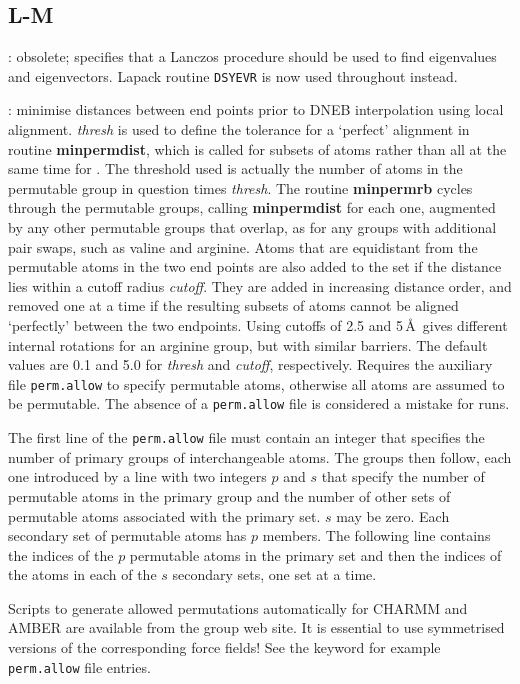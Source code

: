 {{\subsection{L-M}
: obsolete; specifies that a Lanczos procedure should be used to
find eigenvalues and eigenvectors. 
Lapack routine {\tt DSYEVR} is now used throughout instead.


: minimise distances between end points
prior to DNEB interpolation using local alignment.
{\it thresh} is used to define the tolerance for a `perfect' alignment
in routine {\bf minpermdist}, which is called for subsets of atoms
rather than all at the same time for {}.
The threshold used is actually the number of atoms in the permutable
group in question times {\it thresh\/}.
The routine {\bf minpermrb} cycles through the permutable groups,
calling {\bf minpermdist} for each one, augmented by any other permutable
groups that overlap, as for any groups with additional pair swaps, such
as valine and arginine.
Atoms that are equidistant from the permutable atoms in the two end points
are also added to the set if the distance lies within a cutoff
radius {\it cutoff\/}.
They are added in increasing distance order, and removed one at a time 
if the resulting subsets of atoms cannot be aligned `perfectly' between
the two endpoints.
Using cutoffs of 2.5 and 5\,\AA\ gives different internal rotations for
an arginine group, but with similar barriers. 
The default values are 0.1 and 5.0 for {\it thresh} and {\it cutoff\/},
respectively.
Requires the auxiliary file {\tt perm.allow} to specify permutable atoms, otherwise
all atoms are assumed to be permutable. The absence of a {\tt perm.allow}
file is considered a mistake for  runs.

The first line of the {\tt perm.allow} file must contain an integer
that specifies the number of primary groups of interchangeable atoms.
The groups then follow, each one introduced by a line with two integers $p$ and $s$
that specify the number of permutable atoms in the primary group and the number of other sets
of permutable atoms associated with the primary set.
$s$ may be zero.
Each secondary set of permutable atoms has $p$ members.
The following line contains the indices of the $p$ permutable atoms 
in the primary set and then
the indices of the atoms in each of the $s$ secondary sets, one set at 
a time.

Scripts to generate allowed permutations automatically for CHARMM and AMBER are available from
the group web site. It is essential to use symmetrised versions of the corresponding
force fields! See the {\/} keyword for example {\tt perm.allow} file entries.

}}
